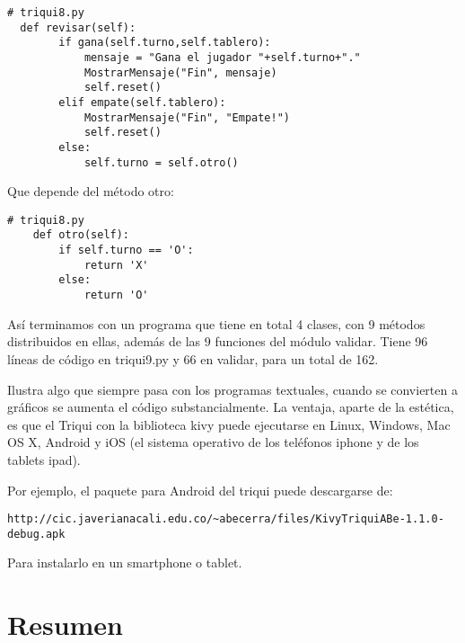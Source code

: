 \beforeverb
\begin{verbatim}
# triqui8.py
  def revisar(self):          
        if gana(self.turno,self.tablero):
            mensaje = "Gana el jugador "+self.turno+"."
            MostrarMensaje("Fin", mensaje)
            self.reset()
        elif empate(self.tablero):
            MostrarMensaje("Fin", "Empate!")
            self.reset()
        else:
            self.turno = self.otro()
\end{verbatim}
\afterverb

Que depende del método otro:


\beforeverb
\begin{verbatim}
# triqui8.py
    def otro(self):
        if self.turno == 'O':
            return 'X'
        else:
            return 'O'

\end{verbatim}
\afterverb

Así terminamos con un programa que tiene en total 4 clases, con 9 métodos
distribuidos en ellas, además de las 9 funciones del módulo validar. Tiene 96
líneas de código en triqui9.py y 66 en validar, para un total de 162.

Ilustra algo que siempre pasa con los programas textuales, cuando se convierten 
a gráficos se aumenta el código substancialmente. La ventaja, aparte de la estética,
es que el Triqui con la biblioteca kivy puede ejecutarse en Linux, Windows, Mac OS X,
Android y iOS (el sistema operativo de los teléfonos iphone y de los tablets ipad).

Por ejemplo, el paquete para Android del triqui puede descargarse de:

\begin{verbatim}
http://cic.javerianacali.edu.co/~abecerra/files/KivyTriquiABe-1.1.0-debug.apk
\end{verbatim}

Para instalarlo en un smartphone o tablet. 

\section{Resumen}

